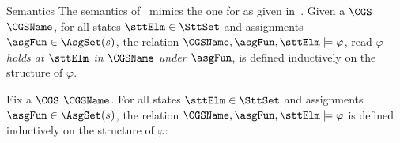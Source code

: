 \begin{subsection}{Semantics}
			The semantics of \GSLT\ mimics the one for \SL as given in~\cite{MMPV14}.
      Given a $\CGS$ $\CGSName$, for all
			states $\sttElm \in \SttSet$ and assignments $\asgFun \in
			\AsgSet(s)$, the relation $\CGSName, \asgFun, \sttElm \models
			\varphi$, read \emph{$\varphi$ holds at $\sttElm$ in $\CGSName$ under $\asgFun$}, is defined inductively on the structure of $\varphi$.
			                \begin{definition}
			                        \label{}
			                        Fix a $\CGS$ $\CGSName$. For all states $\sttElm \in \SttSet$ and assignments $\asgFun \in \AsgSet(s)$,
			                        the relation $\CGSName, \asgFun, \sttElm \models \varphi$ is defined inductively on the structure of $\varphi$:
\end{definition}
\end{subsection}

